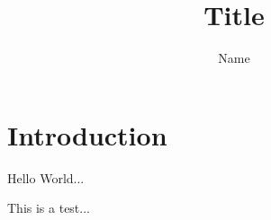 \documentclass{article}
\title{Title}
\author{Name}
\begin{document}
\maketitle

\section{Introduction}

Hello World...

This is a test...
\end{document}
